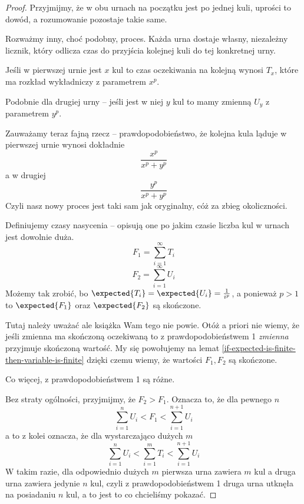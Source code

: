 \begin{proof}
    Przyjmijmy, że w obu urnach na początku jest po jednej kuli, uprości to dowód, a rozumowanie pozostaje takie same.
    
    Rozważmy inny, choć podobny, proces.
    Każda urna dostaje własny, niezależny licznik, który odlicza czas do przyjścia kolejnej kuli do tej konkretnej urny.
    
    Jeśli w pierwszej urnie jest \( x \) kul to czas oczekiwania na kolejną wynosi \( T_x \), które ma rozkład wykładniczy z parametrem \( x^p \).
    
    Podobnie dla drugiej urny -- jeśli jest w niej \( y \) kul to mamy zmienną \( U_y \) z parametrem \( y^p \).
    
    Zauważamy teraz fajną rzecz -- prawdopodobieństwo, że kolejna kula ląduje w pierwszej urnie wynosi dokładnie
    \[
         \frac{x^p}{x^p + y^p}
    \]
    a w drugiej
    \[
        \frac{y^p}{x^p + y^p}
    \]
    Czyli nasz nowy proces jest taki sam jak oryginalny, cóż za zbieg okoliczności.
    
    Definiujemy czasy nasycenia -- opisują one po jakim czasie liczba kul w urnach jest dowolnie duża.
    \[
        F_1 = \sum_{i=1}^\infty T_i
    \]
    \[
        F_2 = \sum_{i=1}^\infty U_i
    \]
    Możemy tak zrobić, bo \(\expected{T_i} = \expected{U_i} = \frac{1}{i^p}\), a ponieważ \( p > 1 \) to \( \expected{F_1}\) oraz \(\expected{F_2} \) są skończone.
    
    Tutaj należy uważać ale książka Wam tego nie powie.
    Otóż a priori nie wiemy, że jeśli zmienna ma skończoną oczekiwaną to z prawdopodobieństwem 1 \textit{zmienna} przyjmuje skończoną wartość.
    My się powołujemy na lemat \ref{if-expected-is-finite-then-variable-is-finite}
    dzięki czemu wiemy, że wartości \( F_1, F_2 \) są skończone.
    
    
    Co więcej, z prawdopodobieństwem 1 są różne.
    
    Bez straty ogólności, przyjmijmy, że \( F_2 > F_1 \). Oznacza to, że dla pewnego \( n \)
    \[
        \sum_{i=1}^n U_i < F_1 < \sum_{i=1}^{n+1} U_i
    \]
    a to z kolei oznacza, że dla wystarczająco dużych \( m \)
    \[
        \sum_{i=1}^n U_i < \sum_{i=1}^m T_i < \sum_{i=1}^{n+1} U_i
    \]
    W takim razie, dla odpowiednio dużych \( m \) pierwsza urna zawiera \( m \) kul a druga urna zawiera jedynie \( n \) kul, czyli z prawdopodobieństwem 1 druga urna utknęła na posiadaniu \( n \) kul, a to jest to co chcieliśmy pokazać.
\end{proof}

